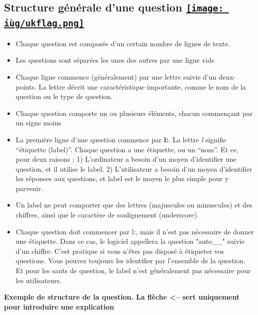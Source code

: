 \documentclass[
]{book}
\begin{document}
\hypertarget{structure-guxe9nuxe9rale-dune-question-ukflag}{%
\subsection[Structure générale d'une question
]{\texorpdfstring{Structure générale d'une question
\href{https://www.psytoolkit.org/doc3.1.0/online-survey-syntax.html\#questionstructure}{\protect\texttt{[image: iùg/ukflag.png]}}}{Structure générale d'une question ukflag}}\label{structure-guxe9nuxe9rale-dune-question-ukflag}}

\begin{itemize}
\item
  Chaque question est composée d'un certain nombre de lignes de texte.
\item
  Les questions sont séparées les unes des autres par une ligne vide
\item
  Chaque ligne commence (généralement) par une lettre suivie d'un
  deux-points. La lettre décrit une caractéristique importante, comme le
  nom de la question ou le type de question.
\item
  Chaque question comporte un ou plusieurs éléments, chacun commençant
  par un signe moins
\item
  La première ligne d'une question commence par \textbf{l:}. La lettre
  \emph{l} signifie ``étiquette (label)''. Chaque question a une
  étiquette, ou un ``nom''. Et ce, pour deux raisons : 1) L'ordinateur a
  besoin d'un moyen d'identifier une question, et il utilise le label.
  2) L'utilisateur a besoin d'un moyen d'identifier les réponses aux
  questions, et label est le moyen le plus simple pour y parvenir.
\item
  Un label ne peut comporter que des lettres (majuscules ou minuscules)
  et des chiffres, ainsi que le caractère de soulignement (underscore).
\item
  Chaque question doit commencer par l:, mais il n'est pas nécessaire de
  donner une étiquette. Dans ce cas, le logiciel appellera la question
  "auto\_\_" suivie d'un chiffre. C'est pratique si vous n'êtes pas
  disposé à étiqueter vos questions. Vous pouvez toujours les identifier
  par l'ensemble de la question. Et pour les sauts de question, le label
  n'est généralement pas nécessaire pour les utilisateurs.
\end{itemize}

\textbf{Exemple de structure de la question. La flèche \textless-- sert
uniquement pour introduire une explication}
\end{document}
